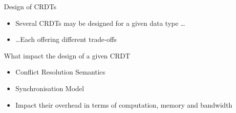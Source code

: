 \begin{frame}{Design of CRDTs}
    \begin{itemize}
        \item \alert{Several CRDTs} may be designed \alert{for a given data type} \dots
        \item \dots Each offering different trade-offs
    \end{itemize}
    \pause
    \begin{block}{What impact the design of a given CRDT \cite{2018-crdts-overview-preguica}}
        \begin{itemize}
            \item Conflict Resolution Semantics
            \item Synchronisation Model
        \end{itemize}
    \end{block}
    \pause
    \begin{itemize}
        \item Impact their \alert{overhead in terms of computation, memory and bandwidth}
    \end{itemize}
\end{frame}